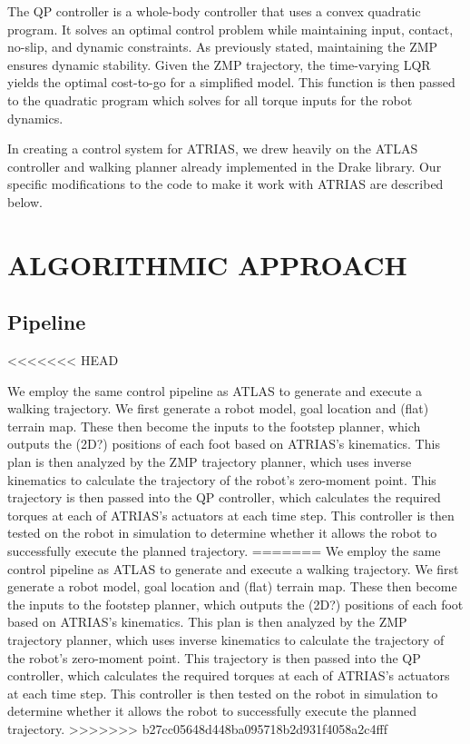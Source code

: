 \documentclass[letterpaper, 10 pt, conference]{ieeeconf}  %
\begin{document}
The QP controller is a whole-body controller that uses a convex quadratic program. It solves an optimal control problem while maintaining input, contact, no-slip, and dynamic constraints. As previously stated, maintaining the ZMP ensures dynamic stability. Given the ZMP trajectory, the time-varying LQR yields the optimal cost-to-go for a simplified model. This function is then passed to the quadratic program which solves for all torque inputs for the robot dynamics.

In creating a control system for ATRIAS, we drew heavily on the ATLAS controller and walking planner already implemented in the Drake library. Our specific modifications to the code to make it work with ATRIAS are described below.

\section{ALGORITHMIC APPROACH}

\subsection{Pipeline}

<<<<<<< HEAD

We employ the same control pipeline as ATLAS to generate and execute a walking trajectory. We first generate a robot model, goal location and (flat) terrain map. These then become the inputs to the footstep planner, which outputs the (2D?) positions of each foot based on ATRIAS’s kinematics. This plan is then analyzed by the ZMP trajectory planner, which uses inverse kinematics to calculate the trajectory of the robot’s zero-moment point. This trajectory is then passed into the QP controller, which calculates the required torques at each of ATRIAS’s actuators at each time step. This controller is then tested on the robot in simulation to determine whether it allows the robot to successfully execute the planned trajectory.
=======
We employ the same control pipeline as ATLAS to generate and execute a walking trajectory. We first generate a robot model, goal location and (flat) terrain map. These then become the inputs to the footstep planner, which outputs the (2D?) positions of each foot based on ATRIAS’s kinematics. This plan is then analyzed by the ZMP trajectory planner, which uses inverse kinematics to calculate the trajectory of the robot’s zero-moment point. This trajectory is then passed into the QP controller, which calculates the required torques at each of ATRIAS’s actuators at each time step. This controller is then tested on the robot in simulation to determine whether it allows the robot to successfully execute the planned trajectory. \cite{dai14}\cite{deits14}
>>>>>>> b27cc05648d448ba095718b2d931f4058a2c4fff
\end{document}
